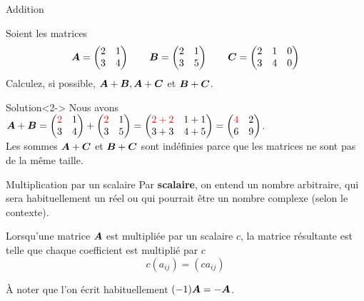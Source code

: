 \documentclass[french, handout]{beamer}
\begin{document}
\begin{frame}{Addition}
\begin{example}
    Soient les matrices \[
    \boldsymbol{A} = \begin{pmatrix}
        2 & 1 \\
        3 & 4
        \end{pmatrix}
    \qquad
    \boldsymbol{B} = \begin{pmatrix}
        2 & 1 \\
        3 & 5
        \end{pmatrix}
        \qquad
    \boldsymbol{C} = \begin{pmatrix}
        2 & 1 & 0\\
        3 & 4 & 0
        \end{pmatrix}
    \]
    Calculez, si possible, $\boldsymbol{A}+\boldsymbol{B}, \boldsymbol{A}+\boldsymbol{C}$ et $\boldsymbol{B}+\boldsymbol{C}$.
\end{example}
\begin{block}{Solution}<2->
    Nous avons $\displaystyle
    \boldsymbol{A}+\boldsymbol{B} = \begin{pmatrix}
                {\color{red}2} & 1\\
                3 & 4
                \end{pmatrix} + 
                \begin{pmatrix}
                {\color{red}2} & 1\\
                3 & 5
                \end{pmatrix} = \begin{pmatrix}
                {\color{red}2+2} & 1+1\\
                3+3 & 4+5
                \end{pmatrix} = \begin{pmatrix}
            {\color{red}4} & 2\\
            6 & 9
            \end{pmatrix}
    $.\\[5pt]   
    Les sommes $\boldsymbol{A}+\boldsymbol{C}$ et $\boldsymbol{B}+\boldsymbol{C}$ sont indéfinies parce que les matrices ne
    sont pas de la même taille.
    \end{block}
\end{frame}

\begin{frame}{Multiplication par un scalaire}
Par \textbf{scalaire}, on entend un nombre arbitraire, qui sera
habituellement un réel ou qui pourrait être un nombre complexe (selon
le contexte).   
\begin{definition}
Lorsqu'une matrice $\boldsymbol{A}$ est multipliée par un scalaire $c$,
la matrice résultante est telle que chaque coefficient est multiplié par $c$
\[
c(a_{ij}) = (ca_{ij})
\]
\end{definition}

À noter que l'on écrit habituellement $(-1) \boldsymbol{A} = -\boldsymbol{A}$.
\end{frame}
\end{document}
